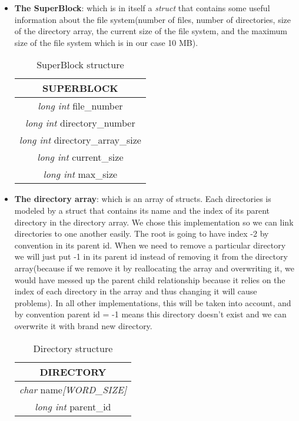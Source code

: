 \begin{itemize}
    \item \textbf{The SuperBlock}: which is in itself a \textit{struct} that contains some useful information about the file system(number of files, number of directories, size of the directory array, the current size of the file system, and the maximum size of the file system which is in our case 10 MB).\\

    \begin{table}[hbt!]
        \centering
        \begin{tabular}{|c|}
            \hline
            \textbf{SUPERBLOCK} \\
            \hline
            \textit{long int} file\_number \\
            \textit{long int} directory\_number \\
            \textit{long int} directory\_array\_size \\
            \textit{long int} current\_size \\
            \textit{long int} max\_size \\
            \hline
        \end{tabular}
        \caption{SuperBlock structure}
        \label{tab:my_label}
    \end{table}
    
    \item \textbf{The directory array}: which is an array of structs.
    Each directories is modeled by a struct that contains its name and the index of its parent directory in the directory array. 
    We chose this implementation so we can link directories to one another easily.
    The root is going to have index -2 by convention in its parent id. 
    When we need to remove a particular directory we will just put -1 in its parent id instead of removing it from the directory array(because if we remove it by reallocating the array and overwriting it, we would have messed up the parent child relationship because it relies on the index of each directory in the array and thus changing it will cause problems). 
    In all other implementations, this will be taken into account, and by convention parent id = -1 means this directory doesn't exist and we can overwrite it with brand new directory.\\

    \begin{table}[hbt!]
        \centering
        \begin{tabular}{|c|}
            \hline
            \textbf{DIRECTORY} \\
            \hline
            \textit{char} name\textit{[WORD\_SIZE]} \\
            \textit{long int} parent\_id \\
            \hline
        \end{tabular}
        \caption{Directory structure}
        \label{tab:my_label}
    \end{table}


\end{itemize}
